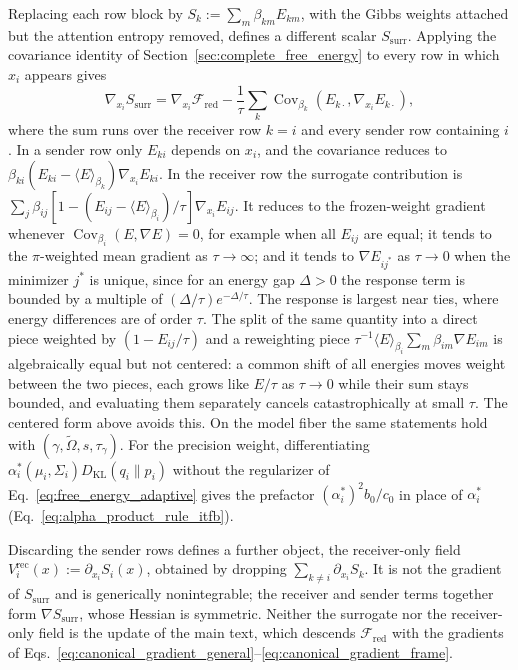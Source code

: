 \documentclass[11pt]{article}
\begin{document}
Replacing each row block by $S_k := \sum_m \beta_{km}E_{km}$, with the Gibbs weights attached but the attention entropy removed, defines a different scalar $S_{\mathrm{surr}}$. Applying the covariance identity of Section~\ref{sec:complete_free_energy} to every row in which $x_i$ appears gives
\begin{equation}
\nabla_{x_i}S_{\mathrm{surr}} = \nabla_{x_i}\mathcal{F}_{\mathrm{red}} - \frac{1}{\tau}\sum_{k}\operatorname{Cov}_{\beta_k}\left(E_{k\cdot}, \nabla_{x_i}E_{k\cdot}\right),
\label{eq:surrogate_covariance_gap}
\end{equation}
where the sum runs over the receiver row $k = i$ and every sender row containing $i$. In a sender row only $E_{ki}$ depends on $x_i$, and the covariance reduces to $\beta_{ki}(E_{ki} - \langle E\rangle_{\beta_k})\nabla_{x_i}E_{ki}$. In the receiver row the surrogate contribution is $\sum_j \beta_{ij}[1 - (E_{ij} - \langle E\rangle_{\beta_i})/\tau]\nabla_{x_i}E_{ij}$. It reduces to the frozen-weight gradient whenever $\operatorname{Cov}_{\beta_i}(E, \nabla E) = 0$, for example when all $E_{ij}$ are equal; it tends to the $\pi$-weighted mean gradient as $\tau \to \infty$; and it tends to $\nabla E_{ij^*}$ as $\tau \to 0$ when the minimizer $j^*$ is unique, since for an energy gap $\Delta > 0$ the response term is bounded by a multiple of $(\Delta/\tau)e^{-\Delta/\tau}$. The response is largest near ties, where energy differences are of order $\tau$. The split of the same quantity into a direct piece weighted by $(1 - E_{ij}/\tau)$ and a reweighting piece $\tau^{-1}\langle E\rangle_{\beta_i}\sum_m\beta_{im}\nabla E_{im}$ is algebraically equal but not centered: a common shift of all energies moves weight between the two pieces, each grows like $E/\tau$ as $\tau \to 0$ while their sum stays bounded, and evaluating them separately cancels catastrophically at small $\tau$. The centered form above avoids this. On the model fiber the same statements hold with $(\gamma, \tilde\Omega, s, \tau_\gamma)$. For the precision weight, differentiating $\alpha_i^*(\mu_i,\Sigma_i)D_{\mathrm{KL}}(q_i\|p_i)$ without the regularizer of Eq.~\eqref{eq:free_energy_adaptive} gives the prefactor $(\alpha_i^*)^2 b_0/c_0$ in place of $\alpha_i^*$ (Eq.~\eqref{eq:alpha_product_rule_itfb}).

Discarding the sender rows defines a further object, the receiver-only field $V_i^{\mathrm{rec}}(x) := \partial_{x_i}S_{i}(x)$, obtained by dropping $\sum_{k \ne i}\partial_{x_i}S_{k}$. It is not the gradient of $S_{\mathrm{surr}}$ and is generically nonintegrable; the receiver and sender terms together form $\nabla S_{\mathrm{surr}}$, whose Hessian is symmetric. Neither the surrogate nor the receiver-only field is the update of the main text, which descends $\mathcal{F}_{\mathrm{red}}$ with the gradients of Eqs.~\eqref{eq:canonical_gradient_general}--\eqref{eq:canonical_gradient_frame}.
\end{document}
